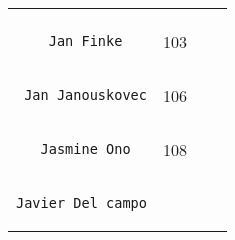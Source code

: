 \documentclass[]{article}
\begin{document}
\begin{longtable}[c]{@{}llll@{}}
\begin{minipage}[t]{0.15\columnwidth}
\end{minipage}
\\\noalign{\medskip}
\begin{minipage}[t]{0.39\columnwidth}\raggedright
\begin{verbatim}
    Jan Finke
\end{verbatim}
\end{minipage} & \begin{minipage}[t]{0.10\columnwidth}\raggedright
103
\end{minipage} & \begin{minipage}[t]{0.13\columnwidth}\raggedright
\end{minipage} & \begin{minipage}[t]{0.15\columnwidth}\raggedright
\end{minipage}
\\\noalign{\medskip}
\begin{minipage}[t]{0.39\columnwidth}\raggedright
\begin{verbatim}
 Jan Janouskovec
\end{verbatim}
\end{minipage} & \begin{minipage}[t]{0.10\columnwidth}\raggedright
106
\end{minipage} & \begin{minipage}[t]{0.13\columnwidth}\raggedright
\end{minipage} & \begin{minipage}[t]{0.15\columnwidth}\raggedright
\end{minipage}
\\\noalign{\medskip}
\begin{minipage}[t]{0.39\columnwidth}\raggedright
\begin{verbatim}
   Jasmine Ono
\end{verbatim}
\end{minipage} & \begin{minipage}[t]{0.10\columnwidth}\raggedright
108
\end{minipage} & \begin{minipage}[t]{0.13\columnwidth}\raggedright
\end{minipage} & \begin{minipage}[t]{0.15\columnwidth}\raggedright
\end{minipage}
\\\noalign{\medskip}
\begin{minipage}[t]{0.39\columnwidth}\raggedright
\begin{verbatim}
Javier Del campo

\end{verbatim}
\end{minipage}
\end{longtable}
\end{document}
